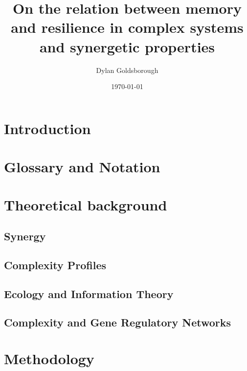 \documentclass{article}
\title{On the relation between memory and resilience in complex systems and synergetic properties}
\author{Dylan Goldsborough}
\date{\today}
\begin{document}
\maketitle



\section{Introduction}
\label{sec:introduction}



\section{Glossary and Notation}



\section{Theoretical background}

\subsection{Synergy}
\label{sec:synergy}



\subsection{Complexity Profiles}
\label{sec:profile}



\subsection{Ecology and Information Theory}
\label{sec:ecology}


\subsection{Complexity and Gene Regulatory Networks}
\label{sec:grn}



\section{Methodology}
\label{sec:methods}
\end{document}
